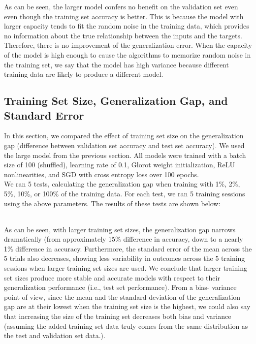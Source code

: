 \documentclass{amsart}
\theoremstyle{definition}
\theoremstyle{remark}
\numberwithin{equation}{section}
\begin{document}
As can be seen, the larger model confers no benefit on the validation set even
even though the training set accuracy is better. This is because the model with
larger capacity tends to fit the random noise in the training data, which
provides no information about the true relationship between the inputs and the
targets. Therefore, there is no improvement of the generalization error. When
the capacity of the model is high enough to cause the algorithms to memorize
random noise in the training set, we say that the model has high variance
because different training data are likely to produce a different model. \\


\subsection{Training Set Size, Generalization Gap, and Standard Error}

In this section, we compared the effect of training set size on the generalization
gap (difference between validation set accuracy and test set accuracy). We used
the large model from the previous section. All models were trained with a batch
size of 100 (shuffled), learning rate of 0.1, Glorot weight initialization, ReLU
nonlinearities, and SGD with cross entropy loss over 100 epochs. \\

We ran 5 tests, calculating the generalization gap when training with 1\%, 2\%,
5\%, 10\%, or 100\% of the training data. For each test, we ran 5 training
sessions using the above parameters. The results of these tests are shown below: \\

{\centering
{}\par
}\\

As can be seen, with larger training set sizes, the generalization gap narrows
dramatically (from approximately 15\% difference in accuracy, down to a nearly
1\% difference in accuracy. Furthermore, the standard error of the mean across
the 5 trials also decreases, showing less variability in outcomes across the 5
training sessions when larger training set sizes are used. We conclude that
larger training set sizes produce more stable and accurate models with respect
to their generalization performance (i.e., test set performance). From a bias-
variance point of view, since the mean and the standard deviation of the
generalization gap are at their lowest when the training set size is the
highest, we could also say that increasing the size of the training set
decreases both bias and variance (assuming the added training set data truly
comes from the same distribution as the test and validation set data.).  \\
\end{document}
